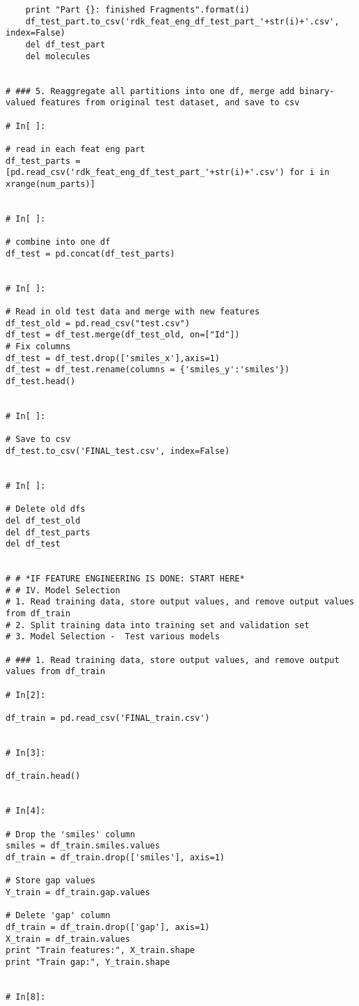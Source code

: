 \documentclass[11pt, oneside]{article}   	%
\begin{document}
\begin{lstlisting}
    print "Part {}: finished Fragments".format(i)
    df_test_part.to_csv('rdk_feat_eng_df_test_part_'+str(i)+'.csv', index=False)
    del df_test_part
    del molecules


# ### 5. Reaggregate all partitions into one df, merge add binary-valued features from original test dataset, and save to csv

# In[ ]:

# read in each feat eng part
df_test_parts = [pd.read_csv('rdk_feat_eng_df_test_part_'+str(i)+'.csv') for i in xrange(num_parts)]


# In[ ]:

# combine into one df
df_test = pd.concat(df_test_parts)


# In[ ]:

# Read in old test data and merge with new features
df_test_old = pd.read_csv("test.csv")
df_test = df_test.merge(df_test_old, on=["Id"])
# Fix columns
df_test = df_test.drop(['smiles_x'],axis=1)
df_test = df_test.rename(columns = {'smiles_y':'smiles'})
df_test.head()


# In[ ]:

# Save to csv
df_test.to_csv('FINAL_test.csv', index=False)


# In[ ]:

# Delete old dfs
del df_test_old
del df_test_parts
del df_test


# # *IF FEATURE ENGINEERING IS DONE: START HERE*
# # IV. Model Selection 
# 1. Read training data, store output values, and remove output values from df_train
# 2. Split training data into training set and validation set
# 3. Model Selection -  Test various models

# ### 1. Read training data, store output values, and remove output values from df_train

# In[2]:

df_train = pd.read_csv('FINAL_train.csv')


# In[3]:

df_train.head()


# In[4]:

# Drop the 'smiles' column 
smiles = df_train.smiles.values
df_train = df_train.drop(['smiles'], axis=1)

# Store gap values
Y_train = df_train.gap.values

# Delete 'gap' column
df_train = df_train.drop(['gap'], axis=1)
X_train = df_train.values
print "Train features:", X_train.shape
print "Train gap:", Y_train.shape


# In[8]:


\end{lstlisting}
\end{document}
